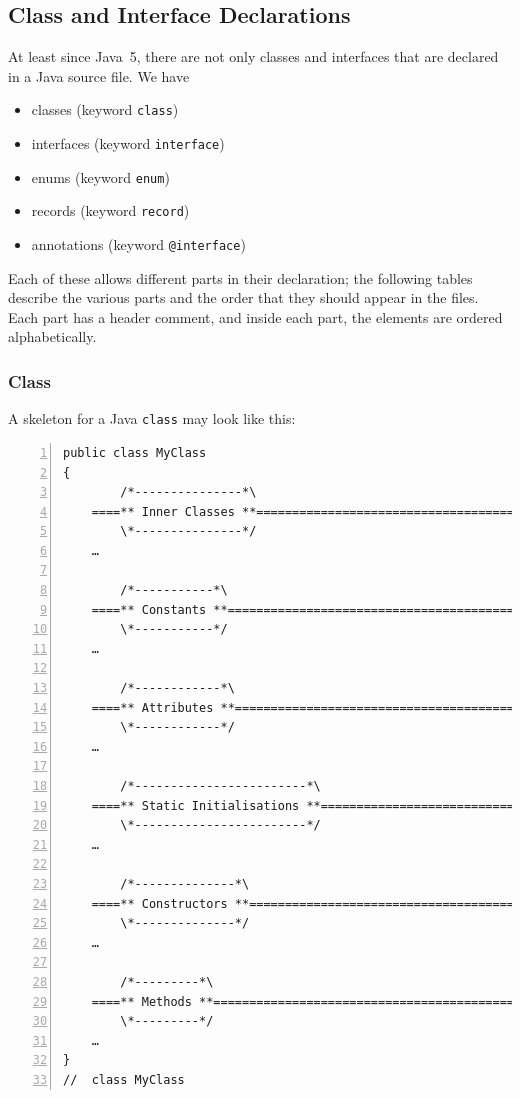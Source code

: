 \documentclass[12pt,a4paper,titlepage, parskip=half, headsepline, footsepline, cleardoubleplain]{scrbook}
\begin{document}
\subsection{Class and Interface Declarations}\label{sec:ClassAndInterfaceDeclarations}
At least since Java~5, there are not only classes and interfaces that are declared in a Java source file. We have

\begin{itemize}[nosep]
\item{classes (keyword \lstinline|class|)}
\item{interfaces (keyword \lstinline|interface|)}
\item{enums (keyword \lstinline|enum|)}
\item{records (keyword \lstinline|record|)}
\item{annotations (keyword \lstinline|@interface|)}
\end{itemize}

Each of these allows different parts in their declaration; the following tables describe the various parts and the order that they should appear in the files. Each part has a header comment, and inside each part, the elements are ordered alphabetically.

\subsubsection{Class}
A skeleton for a Java \lstinline|class| may look like this:
\begin{lstlisting}[numbers=left,caption={Class Skeleton}]
public class MyClass 
{
        /*---------------*\
    ====** Inner Classes **==========================================
        \*---------------*/
    …    
        
        /*-----------*\
    ====** Constants **==============================================
        \*-----------*/
    …
        
        /*------------*\
    ====** Attributes **=============================================
        \*------------*/
    …
            
        /*------------------------*\
    ====** Static Initialisations **=================================
        \*------------------------*/
    …
        
        /*--------------*\
    ====** Constructors **===========================================
        \*--------------*/
    …
        
        /*---------*\
    ====** Methods **================================================
        \*---------*/
    …            
}
//  class MyClass
\end{lstlisting}
 
\end{document}
